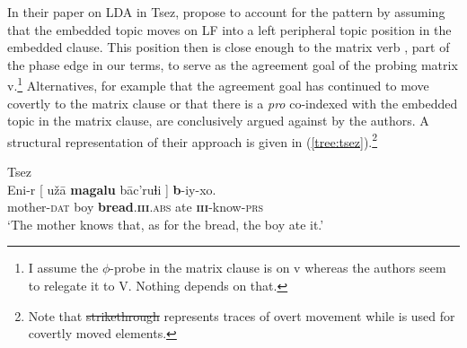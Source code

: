 \documentclass[output=paper
,modfonts
,nonflat]{langsci/langscibook}
\begin{document}
In their paper on LDA in Tsez, \citet{Polinsky_Potsdam2001} propose to account for the pattern by assuming that the embedded topic moves on LF into a left peripheral topic position \citep{Rizzi1997} in the embedded clause. This position then is close enough to the matrix verb \citep[cf. also][]{Bobaljik2008}, part of the phase edge in our terms, to serve as the agreement goal of the probing matrix v.\footnote{I assume the $ \phi $-probe in the matrix clause is on v whereas the authors seem to relegate it to V. Nothing depends on that.} Alternatives, for example that the agreement goal has continued to move covertly to the matrix clause or that there is a \textit{pro} co-indexed with the embedded topic in the matrix clause, are conclusively argued against by the authors. A structural representation of their approach is given in (\ref{tree:tsez}).\footnote{Note that \sout{strikethrough} represents traces of overt movement while  is used for covertly moved elements.}
\begin{exe}
\ex Tsez \citep[][584]{Polinsky_Potsdam2001}\\
	\gll Eni-r [ u\v{z}\=a \textbf{magalu} b\=ac’ruɬi ] \textbf{b}-iy-xo.\\
		 mother-\textsc{dat} {} boy \textbf{bread}.\textsc{\textbf{iii}.abs} ate {} \textsc{\textbf{iii}}-know-\textsc{prs}\\
	\glt `The mother knows that, as for the bread, the boy ate it.'
\end{exe}
\begin{exe}
\ex \label{tree:tsez}
\end{exe}
\end{document}
